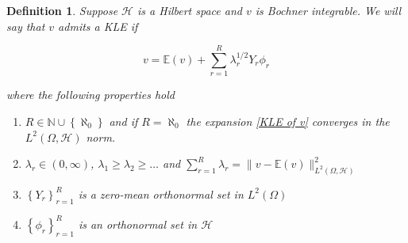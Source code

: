 \documentclass{article}
\numberwithin{theorem}{section}
\numberwithin{lemma}{section}
\newtheorem{definition}{Definition}
\numberwithin{definition}{section}
\numberwithin{assumption}{section}
\numberwithin{proposition}{section}
\numberwithin{remark}{section}
\numberwithin{corollary}{section}
\numberwithin{conjecture}{section}
\numberwithin{example}{section}
\newcommand{\N}{\mathbb{N}}
\newcommand{\E}{\mathbb{E}}
\newcommand{\bset}[1]{\left \lbrace #1 \right \rbrace}
\newcommand{\Span}[1]{\mathrm{Span}\bset{#1}}
\newcommand{\id}{\mathrm{id}}
\newcommand{\CH}{\mathcal H}
\begin{document}
\begin{multicols*}{2}





\begin{definition} \label{Definition of KLE of v}
Suppose $\mathcal H$ is a Hilbert space and $v$ is Bochner integrable. We will say that $v$ admits a KLE if 

\begin{equation} \label{KLE of v} 
    v = \E(v) + \sum_{r=1}^R \lambda_r^{1/2} Y_r \phi_r
\end{equation}

where the following properties hold 

\begin{enumerate}
    \item $R \in \N \cup \bset{\aleph_0}$  and if $R = \aleph_0$ the expansion \eqref{KLE of v} converges in the $L^2(\Omega, \mathcal H)$ norm. 


    \item $\lambda_r \in (0, \infty)$,  $\lambda_1 \geq \lambda_2 \geq \dots$ and $\sum_{r=1}^R \lambda_r = \|v - \E(v)\|^2_{L^2(\Omega, \CH)}$ 

    \item $\bset{Y_r}_{r=1}^R$ is a zero-mean orthonormal set in $L^2(\Omega)$ 

    \item $\bset{\phi_r}_{r=1}^R$ is an orthonormal set in $\mathcal H$ 


  

\end{enumerate}
\end{definition}
\end{multicols*}
\end{document}
